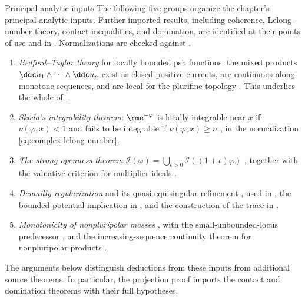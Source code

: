 \begin{important}{Principal analytic inputs}
\label{imp:ch51-imported}
The following five groups organize the chapter's principal analytic
inputs.  Further imported results, including coherence, Lelong-number
theory, contact inequalities, and domination, are identified at their
points of use and in .  Normalizations are
checked against .
\begin{enumerate}
\item\label{itm:ch51-import:bt}
      \emph{Bedford--Taylor theory} for locally bounded psh functions:
      the mixed products $\ddc u_1\wedge\cdots\wedge\ddc u_p$ exist as
      closed positive currents, are continuous along monotone sequences,
      and are local for the plurifine topology
      \cite{BT76,BT82}.  This underlies the whole of
      .
\item\label{itm:ch51-import:skoda}
      \emph{Skoda's integrability theorem}: $\rme^{-\varphi}$ is locally
      integrable near $x$ if $\nu(\varphi,x)<1$ and fails to be
      integrable if $\nu(\varphi,x)\geq n$ \cite{Sko72}, in the
      normalization \eqref{eq:complex-lelong-number}.
\item\label{itm:ch51-import:openness}
      \emph{The strong openness theorem}
      $\mathcal I(\varphi)=\bigcup_{\epsilon>0}\mathcal I((1+\epsilon)\varphi)$
      \cite[Theorem~1.1]{GZ15}, together with the valuative criterion for
      multiplier ideals \cite[Corollary~10.18]{Bou17}.
\item\label{itm:ch51-import:regularization}
      \emph{Demailly regularization} and its quasi-equisingular refinement
      \cite{Dem92reg,DPS01}, used in
      , the bounded-potential
      implication in , and the
      construction of the trace in .
\item\label{itm:ch51-import:monotone}
      \emph{Monotonicity of nonpluripolar masses}
      \cite[Theorem~1.1]{DDNL18mono}, with the small-unbounded-locus
      predecessor \cite[Theorem~1.16]{BEGZ10}, and the increasing-sequence
      continuity theorem for nonpluripolar products
      \cite[Theorem~2.3]{DDNL18mono}.
\end{enumerate}
The arguments below distinguish deductions from these inputs from
additional source theorems.  In particular, the projection proof imports
the contact and domination theorems with their full hypotheses.
\end{important}

